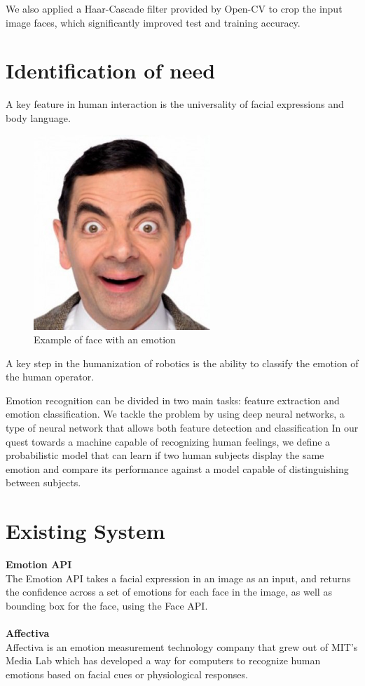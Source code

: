 We also applied a Haar-Cascade filter provided by Open-CV to crop the input image faces, which significantly improved test and training accuracy.

\section{Identification of need}
A key feature in human interaction is the universality of facial expressions and body language.

\begin{figure}[h]
	\centering\includegraphics{images/mrbean.png}
	\caption{Example of face with an emotion}
\end{figure}

A key step in the humanization of robotics is the ability to classify the emotion of the human operator.

Emotion recognition can be divided in two main tasks: feature extraction and emotion classification. We tackle the problem by using deep neural networks, a type of neural network that allows both feature detection and classification In our quest towards a machine capable of recognizing human feelings, we define a probabilistic model that can learn if two human subjects display the same emotion and compare its performance against a model capable of distinguishing between subjects.

\section{Existing System}

\fontsize{14}{0}\textbf{Emotion API}\\
The Emotion API takes a facial expression in an image as an input, and returns the confidence across a set of emotions for each face in the image, as well as bounding box for the face, using the Face API.\\\\
\fontsize{14}{0}\textbf{Affectiva}\\
Affectiva is an emotion measurement technology company that grew out of MIT's Media Lab which has developed a way for computers to recognize human emotions based on facial cues or physiological responses.

